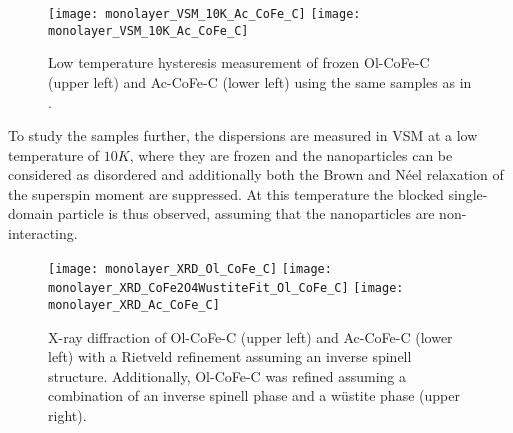 \documentclass[\main/dresen_thesis.tex]{subfiles}
\begin{document}
    \begin{figure}[tb]
      \centering
      \texttt{[image: monolayer\_VSM\_10K\_Ac\_CoFe\_C]}
      \texttt{[image: monolayer\_VSM\_10K\_Ac\_CoFe\_C]}
      \caption{\label{fig:monolaye rs:nanoparticle:vsm10K}Low temperature hysteresis measurement of frozen Ol-CoFe-C (upper left) and Ac-CoFe-C (lower left) using the same samples as in .}
    \end{figure}

    To study the samples further, the dispersions are measured in VSM at a low temperature of $10 \unit{K}$, where they are frozen and the nanoparticles can be considered as disordered and additionally both the Brown and N\'eel relaxation of the superspin moment are suppressed.
    At this temperature the blocked single-domain particle is thus observed, assuming that the nanoparticles are non-interacting.



    \begin{figure}[tb]
      \centering
      \texttt{[image: monolayer\_XRD\_Ol\_CoFe\_C]}
      \texttt{[image: monolayer\_XRD\_CoFe2O4WustiteFit\_Ol\_CoFe\_C]}
      \texttt{[image: monolayer\_XRD\_Ac\_CoFe\_C]}
      \caption{\label{fig:monolayers:nanoparticle:xrd}X-ray diffraction of Ol-CoFe-C (upper left) and Ac-CoFe-C (lower left) with a Rietveld refinement assuming an inverse spinell structure. Additionally, Ol-CoFe-C was refined assuming a combination of an inverse spinell phase and a w\"ustite phase (upper right).}
    \end{figure}
\end{document}
